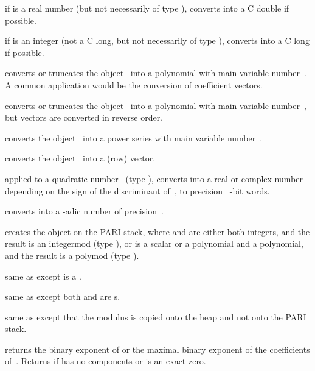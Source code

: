  if  is a real number (but not
necessarily of type ), converts  into a C double if
possible.

 if  is an integer (not a C long, but not
necessarily of type ), converts  into a C long if possible.

 converts or truncates the object~
into a polynomial with main variable number~. A common application
would be the conversion of coefficient vectors.

 converts or truncates the object~
into a polynomial with main variable number~, but vectors are
converted in reverse order.

 converts the object~ into a power
series with main variable number~.

 converts the object~ into a (row) vector.

 applied to a quadratic number~ (type
), converts  into a real or complex number depending on the
sign of the discriminant of~, to precision \hbox{ \B-bit}
words.%

 converts  into a -adic
number of precision~.

 creates the object  on
the PARI stack, where  and  are either both integers, and the
result is an integermod (type ), or  is a scalar or a
polynomial and  a polynomial, and the result is a polymod (type
).

 same as  except  is a
.

 same as  except both
 and  are s.

 same as  except that the
modulus  is copied onto the heap and not onto the PARI stack.

 returns the binary exponent of  or the
maximal binary exponent of the coefficients of~. Returns
\hbox{} if  has no components or is an exact zero.

